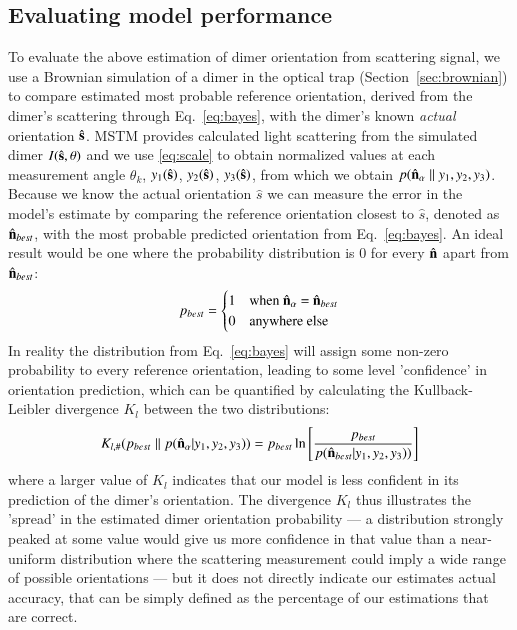 \documentclass[preprint,  3p]{elsarticle}
\begin{document}
\subsection{Evaluating model performance}
\label{sec:divergence}
To evaluate the above estimation of dimer orientation from scattering signal, we use a Brownian simulation of a dimer in the optical trap (Section~\ref{sec:brownian}) to compare estimated most probable reference orientation, derived from the dimer's scattering through Eq.~\eqref{eq:bayes}, with the dimer's known \emph{actual} orientation $\hat{\bf s}$. MSTM provides calculated light scattering from the simulated dimer $I(\hat{\bf s}, \theta)$ and we use \eqref{eq:scale} to obtain normalized values at each measurement angle $\theta_k$,  $y_1(\hat{\bf s})$, $y_2(\hat{\bf s})$, $y_3(\hat{\bf s})$, from which we obtain $p(\hat{\bf n}_{\alpha}\parallel y_1, y_2, y_3)$. Because we know the actual orientation $\hat{s}$ we can measure the error in the model's estimate by comparing the reference orientation closest to $\hat{s}$, denoted as $\hat{\bf n}_{best}$, with the most probable predicted orientation from Eq.~\eqref{eq:bayes}. An ideal result would be one where the probability distribution is 0 for every $\hat{\bf n}$ apart from $\hat{\bf n}_{best}$:
\begin{align}
	\label{eq:best}
	p_{best} = 
	\begin{cases}
		1 & \text{when $\hat{\bf n}_\alpha$ = $\hat{\bf n}_{best}$}\\
		0 & \text{anywhere else}
	\end{cases}
\end{align}
In reality the distribution from Eq.~\eqref{eq:bayes} will assign some non-zero
probability to every reference orientation, leading to some level 'confidence' in orientation prediction, which can be quantified by calculating the Kullback-Leibler divergence $K_l$ between the two distributions:
\begin{align}
	K_{l, \#}(p_{best}\parallel p(\hat{\bf n}_\alpha| y_1, y_2, y_3))
	= p_{best}\ln \left[\frac{p_{best}}{p(\hat{\bf n}_{best}| y_1,y_2,y_3))}
	\right]
	\label{eq;kullback}
\end{align}
where a larger value of $K_l$ indicates that our model is less confident in its
prediction of the dimer's orientation. The divergence $K_l$ thus illustrates the 'spread'
in the estimated dimer orientation probability --- a distribution strongly peaked at 
some value would give us more confidence in that value than a near-uniform distribution 
where the scattering measurement could imply a wide range of possible orientations --- 
but it does not directly indicate our estimates actual accuracy, that can be simply defined as the percentage of our estimations that are correct. 
\end{document}
